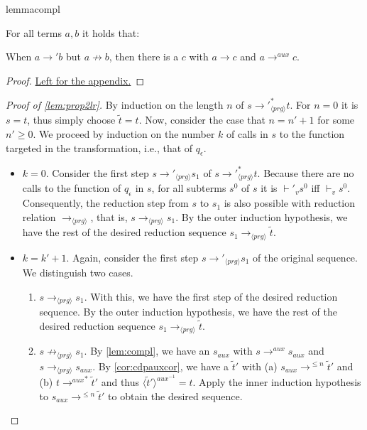 \begin{restatable}[Complementarity]{lemma}{compl}
\label{lem:compl}

For all terms $a,b$ it holds that:

When $a \longrightarrow' b$ but $a \not\longrightarrow b$, then there is a $c$ with $a \longrightarrow c$ and $a \longrightarrow^{aux} c$.

\end{restatable}

\begin{proof}
\hyperref[prf:compl]{Left for the appendix.}
\end{proof}

\begin{proof}[Proof of \autoref{lem:prop2lr}]

By induction on the length $n$ of $s {\longrightarrow'}_{\langle prg \rangle}^* t$. For $n = 0$ it is $s = t$, thus simply choose $\widetilde{t} = t$. Now, consider the case that $n = n'+1$ for some $n' \geq 0$. We proceed by induction on the number $k$ of calls in $s$ to the function targeted in the transformation, i.e., that of $q_\epsilon$.

\begin{itemize}
\item $k = 0$. Consider the first step $s {\longrightarrow'}_{\langle prg \rangle} s_1$ of $s {\longrightarrow'}_{\langle prg \rangle}^* t$. Because there are no calls to the function of $q_\epsilon$ in $s$, for all subterms $s^0$ of $s$ it is $\vdash'_v s^0$ iff $\vdash_v s^0$. Consequently, the reduction step from $s$ to $s_1$ is also possible with reduction relation $\longrightarrow_{\langle prg \rangle}$, that is, $s \longrightarrow_{\langle prg \rangle} s_1$. By the outer induction hypothesis, we have the rest of the desired reduction sequence $s_1 \longrightarrow_{\langle prg \rangle} \widetilde{t}$.

\item $k = k' + 1$. Again, consider the first step $s {\longrightarrow'}_{\langle prg \rangle} s_1$ of the original sequence. We distinguish two cases.
\begin{enumerate}
\item $s \longrightarrow_{\langle prg \rangle} s_1$. With this, we have the first step of the desired reduction sequence. By the outer induction hypothesis, we have the rest of the desired reduction sequence $s_1 \longrightarrow_{\langle prg \rangle} \widetilde{t}$.

\item $s \not\longrightarrow_{\langle prg \rangle} s_1$. By \autoref{lem:compl}, we have an $s_{aux}$ with $s \longrightarrow^{aux} s_{aux}$ and $s \longrightarrow_{\langle prg \rangle} s_{aux}$. By \autoref{cor:cdpauxcor}, we have a $\widetilde{t}'$ with (a) $s_{aux} \longrightarrow^{\leq n} \widetilde{t}'$ and (b) $t {\longrightarrow^{aux}}^* \widetilde{t}'$ and thus $\langle \widetilde{t}' \rangle^{aux^{-1}} = t$. Apply the inner induction hypothesis to $s_{aux} \longrightarrow^{\leq n} \widetilde{t}'$ to obtain the desired sequence.
\end{enumerate}
\end{itemize}

\end{proof}

